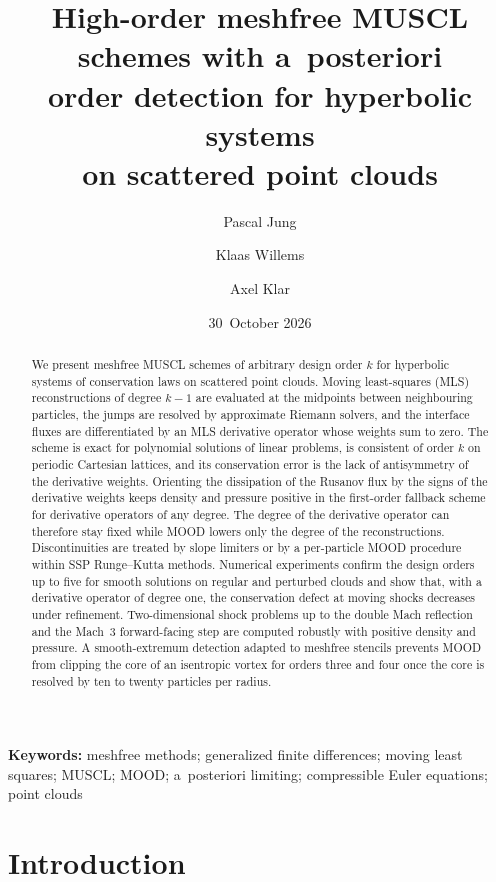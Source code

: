 \documentclass[11pt,a4paper]{article}
\title{High-order meshfree MUSCL schemes with a~posteriori\\
order detection for hyperbolic systems\\ on scattered point clouds}
\author[1]{Pascal Jung}
\author[1,2]{Klaas Willems}
\author[1]{Axel Klar}
\affil[1]{Faculty of Mathematics, RPTU Kaiserslautern-Landau, Kaiserslautern, Germany}
\affil[2]{Department of Computer Science, KU Leuven, Leuven, Belgium}
\date{30~October 2026}
\numberwithin{equation}{section}
\begin{document}
\maketitle

\begin{abstract}
We present meshfree MUSCL schemes of arbitrary design order $k$ for hyperbolic systems of conservation laws on scattered point clouds. Moving least-squares (MLS) reconstructions of degree $k-1$ are evaluated at the midpoints between neighbouring particles, the jumps are resolved by approximate Riemann solvers, and the interface fluxes are differentiated by an MLS derivative operator whose weights sum to zero. The scheme is exact for polynomial solutions of linear problems, is consistent of order $k$ on periodic Cartesian lattices, and its conservation error is the lack of antisymmetry of the derivative weights. Orienting the dissipation of the Rusanov flux by the signs of the derivative weights keeps density and pressure positive in the first-order fallback scheme for derivative operators of any degree. The degree of the derivative operator can therefore stay fixed while MOOD lowers only the degree of the reconstructions. Discontinuities are treated by slope limiters or by a per-particle MOOD procedure within SSP Runge--Kutta methods. Numerical experiments confirm the design orders up to five for smooth solutions on regular and perturbed clouds and show that, with a derivative operator of degree one, the conservation defect at moving shocks decreases under refinement. Two-dimensional shock problems up to the double Mach reflection and the Mach~3 forward-facing step are computed robustly with positive density and pressure. A smooth-extremum detection adapted to meshfree stencils prevents MOOD from clipping the core of an isentropic vortex for orders three and four once the core is resolved by ten to twenty particles per radius.
\end{abstract}

\noindent\textbf{Keywords:} meshfree methods; generalized finite differences; moving least squares; MUSCL; MOOD; a~posteriori limiting; compressible Euler equations; point clouds

\section{Introduction}\label{sec:intro}
\end{document}
